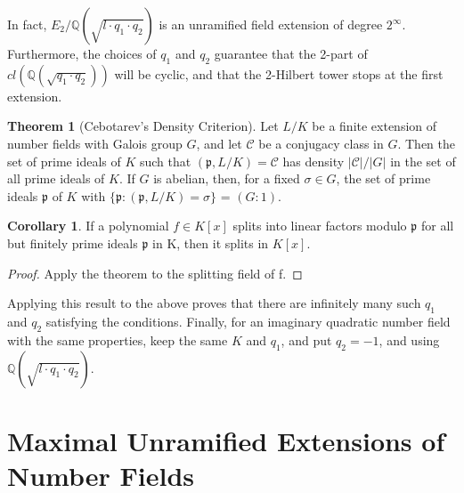 \documentclass[12pt]{extarticle}
\newcommand{\Q}{\mathbb{Q}}
\newcommand{\<}{\langle}
\renewcommand{\>}{\rangle}
\theoremstyle{definition}
\newtheorem{theorem}{Theorem}
\newtheorem{corollary}{Corollary}
\begin{document}
\begin{center}
\end{center}
In fact, $E_2/\Q(\sqrt{l \cdot q_1 \cdot q_2})$ is an unramified field extension of degree $2^{\infty}$. Furthermore, the choices of $q_1$ and $q_2$ guarantee that the 2-part of $cl(\Q(\sqrt{q_1 \cdot q_2}))$ will be cyclic, and that the 2-Hilbert tower stops at the first extension. 


\begin{theorem}[Cebotarev's Density Criterion]
Let $L/K$ be a finite extension of
number fields with Galois group $G$, and let $\mathcal{C}$ be a conjugacy class in $G$. Then the set of
prime ideals of $K$ such that $(\mathfrak{p},L/K)=\mathcal{C}$ has density $|\mathcal{C}|/|G|$ in the set of all prime
ideals of $K$. If $G$ is abelian, then, for a fixed $\sigma \in G$, the set of prime ideals $\mathfrak{p}$ of $K$ with $\{\mathfrak{p}:(\mathfrak{p},L/K)=\sigma\}$  = $(G:1)$.
\end{theorem}
\begin{corollary}
 If a polynomial $f \in K[x]$ splits into linear factors modulo $\mathfrak{p}$ for all but finitely prime ideals $\mathfrak{p}$ in K, then it splits in $K[x]$.
\end{corollary}
\begin{proof}
Apply the theorem to the splitting field of f.
\end{proof}
Applying this result to the above proves that there are infinitely many such $q_1$ and $q_2$ satisfying the conditions.
Finally, for an imaginary quadratic number field with the same properties, keep the same $K$ and $q_1$, and put $q_2=-1$, and using $\Q(\sqrt{l \cdot q_1 \cdot q_2})$. 




\section{Maximal Unramified Extensions of Number Fields}
\end{document}
